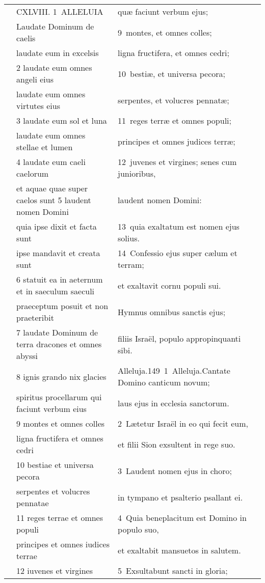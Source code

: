 \documentclass{article}
\begin{document}
\begin{longtable}{@{}p{}p{}p{}@{}}
	&	CXLVIII. 1 ALLELUIA	&	quæ faciunt verbum ejus;	\\
	&	Laudate Dominum de caelis	&	9 montes, et omnes colles;	\\
	&	laudate eum in excelsis	&	ligna fructifera, et omnes cedri;	\\
	&	2 laudate eum omnes angeli eius	&	10 bestiæ, et universa pecora;	\\
	&	laudate eum omnes virtutes eius	&	serpentes, et volucres pennatæ;	\\
	&	3 laudate eum sol et luna	&	11 reges terræ et omnes populi;	\\
	&	laudate eum omnes stellae et lumen	&	principes et omnes judices terræ;	\\
	&	4 laudate eum caeli caelorum	&	12 juvenes et virgines; senes cum junioribus,	\\
	&	et aquae quae super caelos sunt 5 laudent nomen Domini	&	laudent nomen Domini:	\\
	&	quia ipse dixit et facta sunt	&	13 quia exaltatum est nomen ejus solius.	\\
	&	ipse mandavit et creata sunt	&	14 Confessio ejus super cælum et terram;	\\
	&	6 statuit ea in aeternum et in saeculum saeculi	&	et exaltavit cornu populi sui.	\\
	&	praeceptum posuit et non praeteribit	&	Hymnus omnibus sanctis ejus;	\\
	&	7 laudate Dominum de terra dracones et omnes abyssi	&	filiis Israël, populo appropinquanti sibi.	\\
	&	8 ignis grando nix glacies	&	Alleluja.149 1 Alleluja.Cantate Domino canticum novum;	\\
	&	spiritus procellarum qui faciunt verbum eius	&	laus ejus in ecclesia sanctorum.	\\
	&	9 montes et omnes colles	&	2 Lætetur Israël in eo qui fecit eum,	\\
	&	ligna fructifera et omnes cedri	&	et filii Sion exsultent in rege suo.	\\
	&	10 bestiae et universa pecora	&	3 Laudent nomen ejus in choro;	\\
	&	serpentes et volucres pennatae	&	in tympano et psalterio psallant ei.	\\
	&	11 reges terrae et omnes populi	&	4 Quia beneplacitum est Domino in populo suo,	\\
	&	principes et omnes iudices terrae	&	et exaltabit mansuetos in salutem.	\\
	&	12 iuvenes et virgines	&	5 Exsultabunt sancti in gloria;	\\

\end{longtable}
\end{document}
